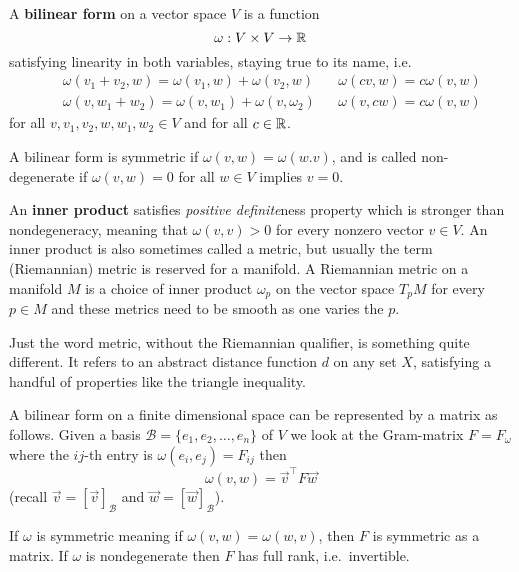 \documentclass[12pt]{amsart}
\begin{document}
A {\bf bilinear form} on a vector space $V$ is a function
\[
	\omega : V \times V \to \mathbb{R}
\]
satisfying linearity in both variables, staying true to its name, i.e.
\begin{align*}
	&& \omega(v_1 + v_2, w) = \omega(v_1, w) + \omega(v_2, w) && \omega(cv, w) = c\omega(v,w)\\
	&& \omega(v, w_1 + w_2) = \omega(v, w_1) + \omega(v, \omega_2) && \omega(v, cw) = c\omega(v,w)
\end{align*}
for all $v,v_1, v_2, w, w_1, w_2 \in V$ and for all $c \in \mathbb{R}$.

A bilinear form is symmetric if $\omega(v,w) = \omega(w.v)$, and is called non-degenerate if $\omega(v,w) = 0$ for all $w \in V$ implies $v = 0$.

An {\bf inner product} satisfies \emph{positive definite}ness property which is stronger than nondegeneracy, meaning that $\omega(v,v)>0$ for every nonzero vector $v \in V$. An inner product is also sometimes called a metric, but usually the term (Riemannian) metric is reserved for a manifold. A Riemannian metric on a manifold $M$ is a choice of inner product $\omega_p$ on the vector space $T_p M$ for every $p \in M$ and these metrics need to be smooth as one varies the $p$. 

\begin{remark}
Just the word metric, without the Riemannian qualifier, is something quite different. It refers to an abstract distance function $d$ on any set $X$, satisfying a handful of properties like the triangle inequality.
\end{remark}

A bilinear form on a finite dimensional space can be represented by a matrix as follows. Given a basis $\mathcal{B} = \{e_1, e_2, \ldots, e_n\}$ of $V$ we look at the Gram-matrix $F = F_\omega$ where the $ij$-th entry is $\omega(e_i, e_j) = F_{ij}$ then
\[
	\omega(v,w) = \vec{v}^\top F \vec{w}
\]
(recall $\vec{v} = [\vec{v}]_{\mathcal{B}}$ and $\vec{w} = [\vec{w}]_{\mathcal{B}}$).

If $\omega$ is symmetric meaning if $\omega(v,w) = \omega(w,v)$, then $F$ is symmetric as a matrix. If $\omega$ is nondegenerate then $F$ has full rank, i.e.\ invertible.
\end{document}
